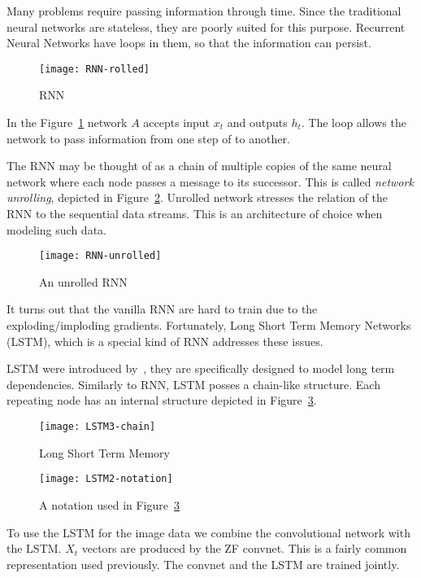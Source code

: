 Many problems require passing information through time.  Since the
traditional neural networks are stateless, they are poorly suited for
this purpose. Recurrent Neural Networks have loops in them, so that
the information can persist.

\begin{figure}[h!]
  \centering \texttt{[image: RNN-rolled]}
  \caption{RNN}
  \label{fig:rnn1}  
\end{figure}

In the Figure~\ref{fig:rnn1} network $A$ accepts input $x_t$ and
outputs $h_t$.  The loop allows the network to pass information from
one step of to another.

The RNN may be thought of as a chain of multiple copies of the same
neural network where each node passes a message to its successor.
This is called \textit{network unrolling}, depicted in
Figure~\ref{fig:rnn2}.  Unrolled network stresses the relation of the
RNN to the sequential data streams.  This is an architecture of choice
when modeling such data.

\begin{figure}[ht!]
  \centering \texttt{[image: RNN-unrolled]}
  \caption{An unrolled RNN}\label{fig:rnn2}
\end{figure}

It turns out that the vanilla RNN are hard to train due to the
exploding/imploding gradients.  Fortunately, Long Short Term Memory
Networks (LSTM), which is a special kind of RNN addresses these issues.

LSTM were introduced by~\cite{hochreiter1997long}, they are
specifically designed to model long term dependencies. Similarly to
RNN, LSTM posses a chain-like structure. Each repeating node has an
internal structure depicted in Figure~\ref{fig:lstm1}.

\begin{figure}[ht!]
  \centering \texttt{[image: LSTM3-chain]}
  \caption{Long Short Term Memory}\label{fig:lstm1}
\end{figure}

\begin{figure}[ht!]
  \centering \texttt{[image: LSTM2-notation]}
  \caption{A notation used in Figure~\ref{fig:lstm1}}\label{fig:lstm2}
\end{figure}

To use the LSTM for the image data we combine the convolutional
network with the LSTM.  $X_t$ vectors are produced by the ZF convnet.
This is a fairly common representation used previously.  The convnet
and the LSTM are trained jointly.


